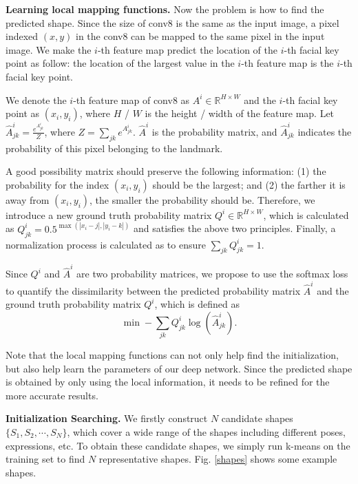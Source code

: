\documentclass[journal]{IEEEtran}
\begin{document}
\textbf{Learning local mapping functions.}
Now the problem is how to find the predicted shape. Since the size of conv8 is the same as  the input image, a pixel indexed $(x,y)$ in the conv8 can be mapped to the same pixel in the input image. We make the $i$-th feature map predict the location of the $i$-th facial key point as follow: the location of the largest value in the $i$-th feature map is the $i$-th facial key point.

We denote the $i$-th feature map of conv8 as $A^i \in \mathbb{R}^{H \times W}$ and the $i$-th facial key point as $(x_i,y_i)$, where $H$ / $W$ is the height / width of the feature map. Let $\hat{A}^i_{jk} =  \frac{e^{A^i_{jk}}}{Z}$, where $Z=\sum_{jk} e^{A^i_{jk}}$. $\hat{A}^i$ is the probability matrix, and $\hat{A}^i_{jk}$ indicates the probability of this pixel  belonging to the landmark.


A good possibility matrix should preserve the following information: (1) the probability for the index $(x_i,y_i)$ should be the largest; and (2) the farther it is away from $(x_i,y_i)$, the smaller the probability should be. Therefore, we introduce a new ground truth probability matrix $Q^i \in \mathbb{R}^{H \times W}$, which is calculated as $Q^i_{jk} = 0.5^{\max(|x_i - j|,|y_i - k|)}$ and satisfies the above two principles. Finally, a normalization process is calculated as to ensure $\sum_{jk} Q^i_{jk} = 1$.

Since $Q^i$ and $\hat{A}^i$ are two probability matrices, we propose to use the softmax loss to quantify the dissimilarity between the predicted probability matrix $\hat{A}^i$ and the ground truth probability matrix $Q^i$, which is defined as
\begin{equation}
 \min - \sum_{jk} Q^i_{jk} \log( \hat{A}^i_{jk}).
\end{equation}


Note that the local mapping functions can not only help find the initialization, but also help learn the parameters of our deep network. Since the predicted shape is obtained by only using the local information, it needs to be refined for the more accurate results.


\textbf{Initialization Searching.}
We firstly construct $N$ candidate shapes $\{S_1, S_2, \cdots, S_N \}$, which cover a wide range of the shapes including different poses, expressions, etc. To obtain these candidate shapes, we simply run k-means on the training set to find $N$ representative shapes. Fig. \ref{shapes} shows some example shapes.
\end{document}
